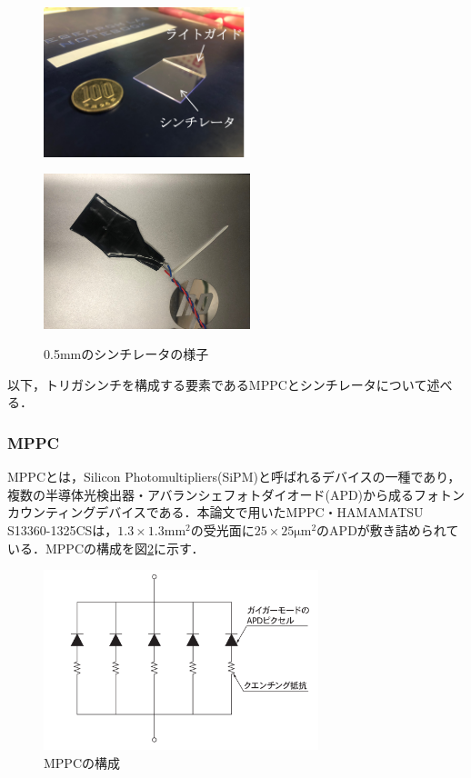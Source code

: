 \begin{figure}[h]
  \centering
  \begin{minipage}[b]{0.45\linewidth}
    \centering
    \includegraphics[width=6cm]{./figure/trigscin.png}
    \label{fig:scin}
  \end{minipage}
  \begin{minipage}[b]{0.45\linewidth}
    \centering
    \includegraphics[width=6cm]{./figure/trigscin1.png}
    \label{fig:trigscin}
  \end{minipage}
  \caption{0.5mmのシンチレータの様子}
  \label{fig:trigscin1}
\end{figure}

以下，トリガシンチを構成する要素であるMPPCとシンチレータについて述べる．

\subsubsection*{MPPC}
MPPCとは，Silicon Photomultipliers(SiPM)と呼ばれるデバイスの一種であり，複数の半導体光検出器・アバランシェフォトダイオード(APD)から成るフォトンカウンティングデバイスである．本論文で用いたMPPC・HAMAMATSU S13360-1325CSは，$1.3 \times 1.3 \mathrm{mm^2}$の受光面に$25 \times 25 \mathrm{\mu m^2}$のAPDが敷き詰められている．MPPCの構成を図\ref{fig:APD}に示す．

\begin{figure}[h]
  \centering
  \includegraphics[width=8cm]{./figure/apd.png}
  \caption{MPPCの構成\cite{03handbo69:online}}
  \label{fig:APD}
\end{figure}

